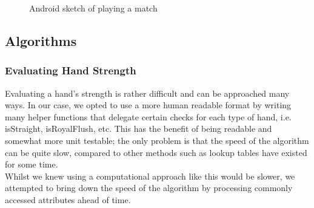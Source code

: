\documentclass[11pt]{article}
\begin{document}
\begin{figure}[h]
	\caption{Android sketch of playing a match}
	
\end{figure} 

\newpage


\subsection{Algorithms}
\subsubsection{Evaluating Hand Strength}
Evaluating a hand's strength is rather difficult and can be approached many ways. In our case, we opted to use a more human readable format by writing many helper functions that delegate certain checks for each type of hand, i.e. isStraight, isRoyalFlush, etc. This has the benefit of being readable and somewhat more unit testable; the only problem is that the speed of the algorithm can be quite slow, compared to other methods such as lookup tables have existed for some time. \cite{lookup} \\ %

Whilst we knew using a computational approach like this would be slower, we attempted to bring down the speed of the algorithm by processing commonly accessed attributes ahead of time.\\

\setlength{\fboxrule}{0pt}
\noindent{}%
\end{document}
